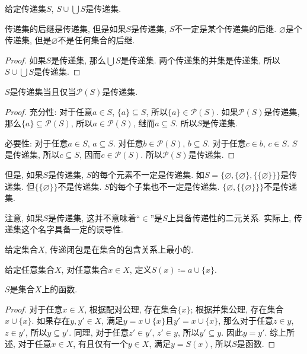 \begin{proposition}
	给定传递集$S$, $S\cup \bigcup S$是传递集.
\end{proposition}

传递集的后继是传递集, 但是如果$S$是传递集, $S$不一定是某个传递集的后继. $\varnothing$是个传递集, 但是$\varnothing$不是任何集合的后继.

\begin{proof}
	如果$S$是传递集, 那么$\bigcup S$是传递集. 两个传递集的并集是传递集, 所以$S\cup \bigcup S$是传递集.
\end{proof}

\begin{proposition}
	$S$是传递集当且仅当$\mathscr P(S)$是传递集.
\end{proposition}

\begin{proof}
	充分性: 对于任意$a\in S$, $\{a\}\subseteq S$, 所以$\{a\}\in \mathscr P(S)$. 如果$\mathscr P(S)$是传递集, 那么$\{a\}\subseteq \mathscr P(S)$, 所以$a\in \mathscr P(S)$, 继而$a\subseteq S$. 所以$S$是传递集.
	
	必要性: 对于任意$a\in S$, $a\subseteq S$. 对任意$b\in \mathscr P(S)$, $b\subseteq S$. 对于任意$c\in b$, $c\in S$. $S$是传递集, 所以$c\subseteq S$, 因而$c\in \mathscr P(S)$. 所以$\mathscr P(S)$是传递集.
\end{proof}

但是, 如果$S$是传递集, $S$的每个元素不一定是传递集. 如$S=\{\varnothing,\{\varnothing \},\{\{\varnothing\}\}\}$是传递集. 但$\{\{\varnothing\}\}$不是传递集. $S$的每个子集也不一定是传递集. $\{\varnothing,\{\{\varnothing\}\}\}$不是传递集.

注意, 如果$S$是传递集, 这并不意味着``$\in$''是$S$上具备传递性的二元关系. 实际上, 传递集这个名字具备一定的误导性.

\begin{definition}
	给定集合$X$, 传递闭包是在集合的包含关系上最小的.
\end{definition}

\begin{definition}
	给定任意集合$X$, 对任意集合$x\in X$, 定义$S(x)\coloneqq a\cup \{x\}$.
\end{definition}

\begin{proposition}
	$S$是集合$X$上的函数.
\end{proposition}

\begin{proof}
	对于任意$x\in X$, 根据配对公理, 存在集合$\{x\}$; 根据并集公理, 存在集合$x\cup \{x\}$. 如果存在$y,y' \in X$, 满足$y=x\cup \{x\}$且$y'=x\cup \{x\}$, 那么对于任意$z\in y$, $z\in y'$, 所以$y\subseteq y'$. 同理, 对于任意$z'\in y'$, $z'\in y$, 所以$y'\subseteq y$. 因此$y=y'$. 综上所述, 对于任意$x\in X$, 有且仅有一个$y\in X$, 满足$y=S(x)$, 所以$S$是函数.
\end{proof}

